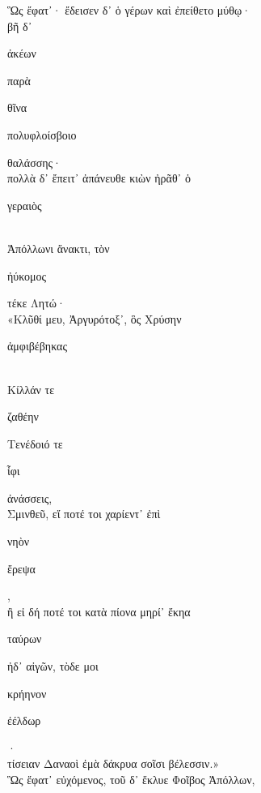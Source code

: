 \documentclass{ransom}
\begin{document}
\renewcommand{\rightheaderwhat}{\rightheaderwhatglosses}%
\begin{foreignpage}
\begin{graytext}
Ὣς ἔφατ᾽· ἔδεισεν δ᾽ ὁ γέρων καὶ ἐπείθετο μύθῳ·\\
βῆ δ᾽ \begin{whitetext}ἀκέων\end{whitetext} παρὰ \begin{whitetext}θῖνα\end{whitetext} \begin{whitetext}πολυφλοίσβοιο\end{whitetext} θαλάσσης·\\
πολλὰ δ᾽ ἔπειτ᾽ ἀπάνευθε κιὼν ἠρᾶθ᾽ ὁ \begin{whitetext}γεραιὸς\end{whitetext}\hfill{}\\
Ἀπόλλωνι ἄνακτι, τὸν \begin{whitetext}ἠύκομος\end{whitetext} τέκε Λητώ·\\
«Κλῦθί μευ, Ἀργυρότοξ᾽, ὃς Χρύσην \begin{whitetext}ἀμφιβέβηκας\end{whitetext}\\
Κίλλάν τε \begin{whitetext}ζαθέην\end{whitetext} Τενέδοιό τε \begin{whitetext}ἶφι\end{whitetext} ἀνάσσεις,\\
Σμινθεῦ, εἴ ποτέ τοι χαρίεντ᾽ ἐπὶ \begin{whitetext}νηὸν\end{whitetext} \begin{whitetext}ἔρεψα\end{whitetext},\\
ἢ εἰ δή ποτέ τοι κατὰ πίονα μηρί᾽ ἔκηα\hfill{}\\
\begin{whitetext}ταύρων\end{whitetext} ἠδ᾽ αἰγῶν, τὸδε μοι \begin{whitetext}κρήηνον\end{whitetext} \begin{whitetext}ἐέλδωρ\end{whitetext}·\\
τίσειαν Δαναοὶ ἐμὰ δάκρυα σοῖσι βέλεσσιν.»\\
Ὣς ἔφατ᾽ εὐχόμενος, τοῦ δ᾽ ἔκλυε Φοῖβος Ἀπόλλων,\\

\end{graytext}
\end{foreignpage}
\end{document}
